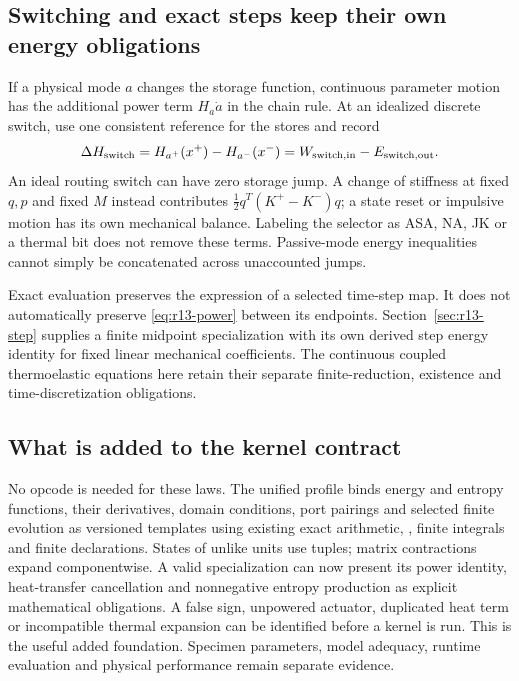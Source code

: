 \subsection{Switching and exact steps keep their own energy obligations}
If a physical mode $a$ changes the storage function, continuous parameter
motion has the additional power term $H_a\dot a$ in the chain rule. At an
idealized discrete switch, use one consistent reference for the stores and
record
\begin{equation}
 \Delta H_{\rm switch}=H_{a^+}(x^+)-H_{a^-}(x^-)
       =W_{\rm switch,in}-E_{\rm switch,out}.
 \label{eq:r13-switch}
\end{equation}
An ideal routing switch can have zero storage jump. A change of stiffness at
fixed $q,p$ and fixed $M$ instead contributes
$\tfrac12q^T(K^+-K^-)q$; a state reset or impulsive motion has its own
mechanical balance. Labeling the selector as ASA, NA, JK or a thermal bit
does not remove these terms. Passive-mode energy inequalities cannot simply
be concatenated across unaccounted jumps.

Exact evaluation preserves the expression of a selected time-step map.
It does not automatically preserve \eqref{eq:r13-power} between its endpoints.
Section~\ref{sec:r13-step} supplies a finite midpoint specialization with its
own derived step energy identity for fixed linear mechanical coefficients.
The continuous coupled thermoelastic equations here retain their separate
finite-reduction, existence and time-discretization obligations.

\subsection{What is added to the kernel contract}
No opcode is needed for these laws. The unified profile binds energy and entropy functions,
their derivatives, domain conditions, port pairings and selected finite
evolution as versioned templates using existing exact arithmetic,
, finite integrals and finite  declarations.
States of unlike units use tuples; matrix contractions expand componentwise.
A valid specialization can now present its power identity, heat-transfer
cancellation and nonnegative entropy production as explicit mathematical
obligations. A false sign, unpowered actuator, duplicated heat term or
incompatible thermal expansion can be identified before a kernel is run.
This is the useful added foundation. Specimen parameters, model adequacy,
runtime evaluation and physical performance remain separate evidence.
